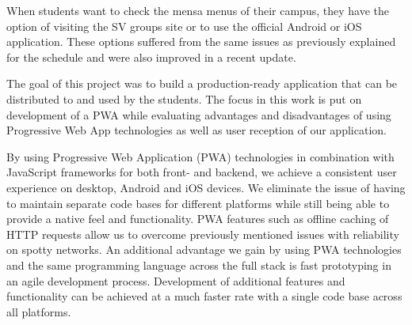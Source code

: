 \begin{markdown}
When students want to check the mensa menus of their campus, they have the option of visiting the SV groups site \cite{SVSite} or to use the official Android or iOS application. These options suffered from the same issues as previously explained for the schedule and were also improved in a recent update.

The goal of this project was to build a production-ready application that can be distributed to and used by the students. The focus in this work is put on development of a PWA while evaluating advantages and disadvantages of using Progressive Web App technologies as well as user reception of our application.

By using Progressive Web Application (PWA) technologies \cite{PWA} in combination with JavaScript frameworks for both front- and backend, we achieve a consistent user experience on desktop, Android and iOS devices. We eliminate the issue of having to maintain separate code bases for different platforms while still being able to provide a native feel and functionality. PWA features such as offline caching of HTTP requests allow us to overcome previously mentioned issues with reliability on spotty networks. An additional advantage we gain by using PWA technologies and the same programming language across the full stack is fast prototyping in an agile development process. Development of additional features and functionality can be achieved at a much faster rate with a single code base across all platforms.

\newpage

\end{markdown}
